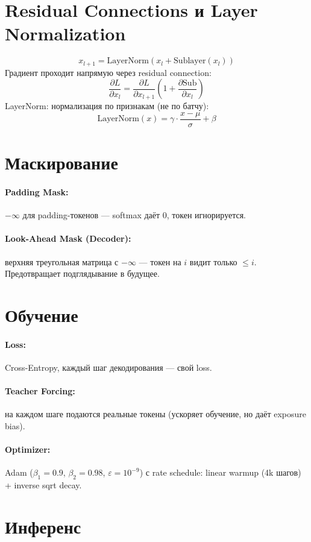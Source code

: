 \documentclass[a4paper,12pt]{article}
\begin{document}
\section{Residual Connections и Layer Normalization}
\[
x_{l+1} = \text{LayerNorm}(x_l + \text{Sublayer}(x_l))
\]
Градиент проходит напрямую через residual connection:
\[
\frac{\partial L}{\partial x_l} = \frac{\partial L}{\partial x_{l+1}} \left(1 + \frac{\partial \text{Sub}}{\partial x_l}\right)
\]
LayerNorm: нормализация по признакам (не по батчу):
\[
\text{LayerNorm}(x) = \gamma \cdot \frac{x - \mu}{\sigma} + \beta
\]

\section{Маскирование}

\paragraph{Padding Mask:} $-\infty$ для padding-токенов — softmax даёт 0, токен игнорируется.

\paragraph{Look-Ahead Mask (Decoder):} верхняя треугольная матрица с $-\infty$ — токен на $i$ видит только $\le i$. Предотвращает подглядывание в будущее.

\section{Обучение}

\paragraph{Loss:} Cross-Entropy, каждый шаг декодирования — свой loss.
\paragraph{Teacher Forcing:} на каждом шаге подаются реальные токены (ускоряет обучение, но даёт exposure bias).
\paragraph{Optimizer:} Adam ($\beta_1=0.9$, $\beta_2=0.98$, $\varepsilon=10^{-9}$) с rate schedule: linear warmup (4k шагов) + inverse sqrt decay.

\section{Инференс}
\end{document}
